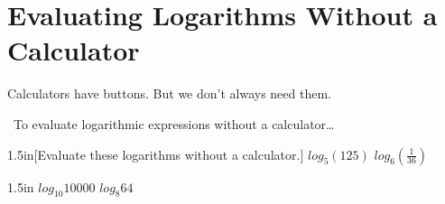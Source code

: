 \section{Evaluating Logarithms Without a Calculator}

Calculators have  buttons.
But we don't always need them.

\begin{myConceptSteps}{%
    ~To evaluate logarithmic expressions without a calculator\dots}
\end{myConceptSteps}

\begin{my2Problems}{1.5in}[Evaluate these logarithms without a calculator.]
    {$log_5(125)$}
    {$log_6(\frac{1}{36})$}
\end{my2Problems}
\begin{my2Problems}{1.5in}
    {$log_{10}10000$}
    {$log_8{64}$}
\end{my2Problems}